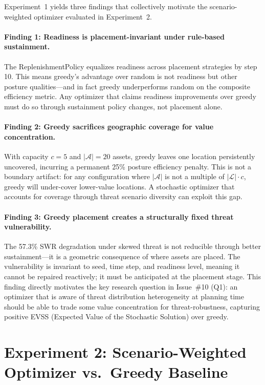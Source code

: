 \documentclass[11pt]{article}
\begin{document}
Experiment~1 yields three findings that collectively motivate the
scenario-weighted optimizer evaluated in Experiment~2.

\paragraph{Finding 1: Readiness is placement-invariant under rule-based sustainment.}
The ReplenishmentPolicy equalizes readiness across placement strategies by
step 10. This means greedy's advantage over random is not readiness but
other posture qualities---and in fact greedy underperforms random on the
composite efficiency metric. Any optimizer that claims readiness improvements
over greedy must do so through sustainment policy changes, not placement alone.

\paragraph{Finding 2: Greedy sacrifices geographic coverage for value concentration.}
With capacity $c = 5$ and $|\mathcal{A}| = 20$ assets, greedy leaves one
location persistently uncovered, incurring a permanent 25\% posture
efficiency penalty. This is not a boundary artifact: for any configuration
where $|\mathcal{A}|$ is not a multiple of $|\mathcal{L}| \cdot c$,
greedy will under-cover lower-value locations. A stochastic optimizer that
accounts for coverage through threat scenario diversity can exploit this gap.

\paragraph{Finding 3: Greedy placement creates a structurally fixed threat vulnerability.}
The 57.3\% SWR degradation under skewed threat is not reducible through
better sustainment---it is a geometric consequence of where assets are placed.
The vulnerability is invariant to seed, time step, and readiness level, meaning
it cannot be repaired reactively; it must be anticipated at the placement stage.
This finding directly motivates the key research question in Issue~\#10 (Q1):
an optimizer that is aware of threat distribution heterogeneity at planning
time should be able to trade some value concentration for threat-robustness,
capturing positive EVSS (Expected Value of the Stochastic Solution)
over greedy.


\section{Experiment 2: Scenario-Weighted Optimizer vs.\ Greedy Baseline}
\label{sec:exp2}
\end{document}
